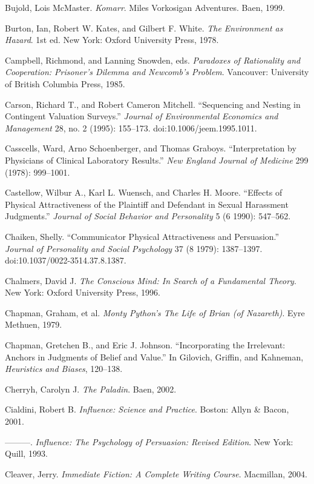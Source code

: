 \documentclass[letterpaper]{book}
\begin{document}
{
 Bujold, Lois McMaster. \textit{Komarr}. Miles Vorkosigan
Adventures. Baen, 1999.}

{
 Burton, Ian, Robert W. Kates, and Gilbert F. White. \textit{The
Environment as Hazard}. 1st ed. New York: Oxford University Press,
1978.}

{
 Campbell, Richmond, and Lanning Snowden, eds. \textit{Paradoxes of
Rationality and Cooperation: Prisoner's Dilemma and
Newcomb's Problem}. Vancouver: University of British
Columbia Press, 1985.}

{
 Carson, Richard T., and Robert Cameron Mitchell.
``Sequencing and Nesting in Contingent Valuation
Surveys.'' \textit{Journal of Environmental Economics
and Management} 28, no. 2 (1995): 155--173.
doi:10.1006/jeem.1995.1011.}

{
 Casscells, Ward, Arno Schoenberger, and Thomas Graboys.
``Interpretation by Physicians of Clinical Laboratory
Results.'' \textit{New England Journal of Medicine}
299 (1978): 999--1001.}

{
 Castellow, Wilbur A., Karl L. Wuensch, and Charles H. Moore.
``Effects of Physical Attractiveness of the Plaintiff
and Defendant in Sexual Harassment Judgments.''
\textit{Journal of Social Behavior and Personality} 5 (6 1990):
547--562.}

{
 Chaiken, Shelly. ``Communicator Physical
Attractiveness and Persuasion.'' \textit{Journal of
Personality and Social Psychology} 37 (8 1979): 1387--1397.
doi:10.1037/0022-3514.37.8.1387.}

{
 Chalmers, David J. \textit{The Conscious Mind: In Search of a
Fundamental Theory}. New York: Oxford University Press, 1996.}

{
 Chapman, Graham, et al. \textit{Monty Python's The
Life of Brian (of Nazareth)}. Eyre Methuen, 1979.}

{
 Chapman, Gretchen B., and Eric J. Johnson.
``Incorporating the Irrelevant: Anchors in Judgments
of Belief and Value.'' In Gilovich, Griffin, and
Kahneman, \textit{Heuristics and Biases}, 120--138.}

{
 Cherryh, Carolyn J. \textit{The Paladin}. Baen, 2002.}

{
 Cialdini, Robert B. \textit{Influence: Science and Practice}.
Boston: Allyn \& Bacon, 2001.}

{
 {}---{}---{}---. \textit{Influence: The Psychology of Persuasion:
Revised Edition}. New York: Quill, 1993.}

{
 Cleaver, Jerry. \textit{Immediate Fiction: A Complete Writing
Course}. Macmillan, 2004.}
\end{document}

